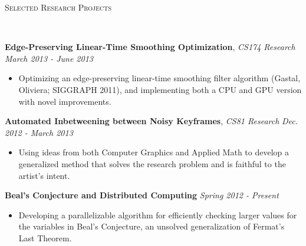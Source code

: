 \documentclass[9pt]{article}
\newenvironment{changemargin}[2]{%
  \begin{list}{}{%
    \setlength{\topsep}{0pt}%
    \setlength{\leftmargin}{#1}%
    \setlength{\rightmargin}{#2}%
    \setlength{\listparindent}{\parindent}%
    \setlength{\itemindent}{\parindent}%
    \setlength{\parsep}{\parskip}%
  }%
  \item[]}{\end{list}
}
\newcommand{\lineover}{
	\begin{changemargin}{-0.05in}{-0.05in}
		\vspace*{-8pt}
		\hrulefill \\
		\vspace*{-2pt}
	\end{changemargin}
}
\newcommand{\header}[1]{
	\begin{changemargin}{-0.5in}{-0.5in}
		\scshape{#1}\\
  	\lineover
	\end{changemargin}
}
\newenvironment{body} {
	\vspace*{-16pt}
	\begin{changemargin}{-0.25in}{-0.5in}
  }	
	{\end{changemargin}
}
\begin{document}
\smallskip




\header{Selected Research Projects}
\smallskip
\begin{body}
	\vspace{14pt}
	\textbf{Edge-Preserving Linear-Time Smoothing Optimization}, \emph{CS174 Research} \hfill \emph{March 2013 - June 2013} \\
	\begin{itemize} \itemsep -0pt
		\item Optimizing an edge-preserving linear-time smoothing filter algorithm (Gastal, Oliviera; SIGGRAPH 2011), and implementing both a CPU and GPU version with novel improvements.
	\end{itemize}
	\textbf{Automated Inbetweening between Noisy Keyframes}, \emph{CS81 Research} \hfill \emph{Dec. 2012 - March 2013} \\
	\begin{itemize} \itemsep -0pt
		\item Using ideas from both Computer Graphics and Applied Math to develop a generalized method that solves the research problem and is faithful to the artist's intent.
	\end{itemize}
	\textbf{Beal's Conjecture and Distributed Computing} \hfill \emph{Spring 2012 - Present}
	\begin{itemize} \itemsep -0pt
		\item Developing a parallelizable algorithm for efficiently checking larger values for the variables in Beal's Conjecture, an unsolved generalization of Fermat's Last Theorem.
	\end{itemize}

\end{body}

\smallskip
\end{document}
